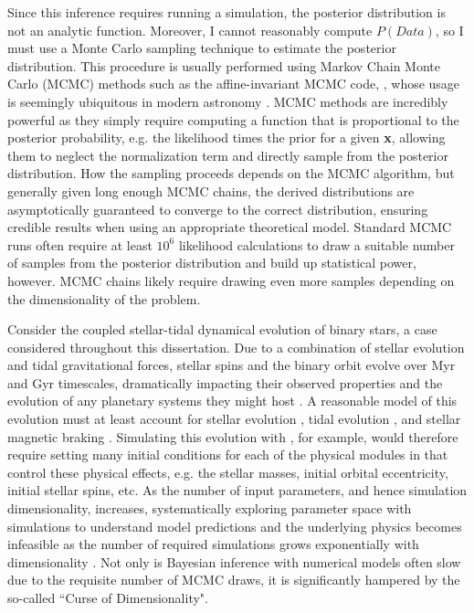 Since this inference requires running a \vplanet simulation, the posterior distribution is not an analytic function. Moreover, I cannot reasonably compute $P(Data)$, so I must use a Monte Carlo sampling technique to estimate the posterior distribution. This procedure is usually performed using Markov Chain Monte Carlo (MCMC) methods such as the affine-invariant MCMC code, \emcee, whose usage is seemingly ubiquitous in modern astronomy \citep{ForemanMackey2013}. MCMC methods are incredibly powerful as they simply require computing a function that is proportional to the posterior probability, e.g. the likelihood times the prior for a given \textbf{x}, allowing them to neglect the normalization term and directly sample from the posterior distribution. How the sampling proceeds depends on the MCMC algorithm, but generally given long enough MCMC chains, the derived distributions are asymptotically guaranteed to converge to the correct distribution, ensuring credible results when using an appropriate theoretical model. Standard MCMC runs often require at least $10^6$ likelihood calculations to draw a suitable number of samples from the posterior distribution and build up statistical power, however. MCMC chains likely require drawing even more samples depending on the dimensionality of the problem.

Consider the coupled stellar-tidal dynamical evolution of binary stars, a case considered throughout this dissertation. Due to a combination of stellar evolution and tidal gravitational forces, stellar spins and the binary orbit evolve over Myr and Gyr timescales, dramatically impacting their observed properties and the evolution of any planetary systems they might host \citep[e.g.][]{Zahn1989,Meibom2005}. A reasonable model of this evolution must at least account for stellar evolution \citep[e.g.][]{Baraffe2015}, tidal evolution \citep[e.g.][]{Hut1981,FerrazMello2008,Leconte2010}, and stellar magnetic braking \citep[e.g.][]{Matt2015}. Simulating this evolution with \vplanet, for example, would therefore require setting many initial conditions for each of the physical modules in \vplanet that control these physical effects, e.g. the stellar masses, initial orbital eccentricity, initial stellar spins, etc.  As the number of input parameters, and hence simulation dimensionality, increases, systematically exploring parameter space with simulations to understand model predictions and the underlying physics becomes infeasible as the number of required simulations grows exponentially with dimensionality \citep{Bellman1957}.  Not only is Bayesian inference with numerical models often slow due to the requisite number of MCMC draws, it is significantly hampered by the so-called ``Curse of Dimensionality".

